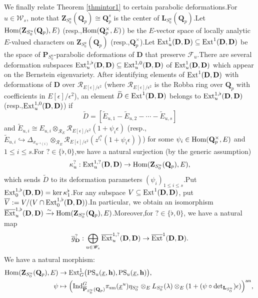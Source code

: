 \documentclass[10pt]{article}
\newcommand{\ind}{{\rm Ind}}
\newcommand{\homo}{{\rm Hom}}
\newcommand{\ext}{{\rm Ext}}
\newcommand{\ana}{{\rm an}}
\newcommand{\op}{{\overline{{\mathbf{P}}}}}
\newcommand{\sm}{{\rm sm}}
\newcommand{\Dpik}{{\mathbf{D}}}
\newcommand{\bL}{{\mathbf{L}}}
\newcommand{\bP}{{\mathbf{P}}}
\newcommand{\bQ}{{\mathbf{Q}}}
\newcommand{\bZ}{{\mathbf{Z}}}
\newcommand{\bh}{{\mathbf{h}}}
\newcommand{\cR}{\mathcal R}
\newcommand{\cF}{\mathcal F}
\newcommand{\sW}{\mathscr W}
\begin{document}
We finally  relate Theorem \ref{thmintor1} to certain parabolic deformations.\;For $u\in \sW_{s}$, note that $\bZ_{S_0^u}(\bQ_p)\cong \bQ_p^s$ is the center of $\bL_{S^u_0}(\bQ_p)$.\;Let $\homo(\bZ_{S_0^u}(\bQ_p),E)$ (resp.,\;$\homo(\bQ_p^{\times},E)$) be the $E$-vector space of locally analytic $E$-valued characters on $\bZ_{S_0^u}(\bQ_p)$ (resp.,\;$\bQ_p^{\times}$).\;Let $\ext^1_u(\Dpik,\Dpik)\subseteq \ext^1(\Dpik,\Dpik)$ be the space of $\bP_{S_0^u}$-parabolic deformations of $\Dpik$ that preserve $\cF_u$.\;There are several deformation subspaces $\ext^{1,\flat}_{u}(\Dpik,\Dpik)\subseteq \ext^{1,0}_{u}(\Dpik,\Dpik)$ of $\ext^{1}_{{u}}(\Dpik,\Dpik)$ which appear on the Bernstein eigenvariety. After identifying elements of $\ext^1(\Dpik,\Dpik)$ with deformations of $\Dpik$ over $\cR_{E[\epsilon]/\epsilon^2}$ (where $\cR_{E[\epsilon]/\epsilon^2}$ is the Robba ring over $\bQ_p$ with coefficients in $E[\epsilon]/\epsilon^2$), an element $\widetilde{D}\in \ext^1(\Dpik,\Dpik)$ belongs to $\ext^{1,\flat}_u(\Dpik,\Dpik)$ (resp.,\;$\ext^{1,0}_u(\Dpik,\Dpik)$) if
\[\widetilde{D}=[\widetilde{E}_{u,1}-\widetilde{E}_{u,2}-\cdots-\widetilde{E}_{u,s}]\]
and $\widetilde{E}_{u,i}\cong {E}_{u,i}\otimes_{\cR_{E}}\cR_{E[\epsilon]/\epsilon^2}(1+\psi_i\epsilon)$ (resp.,\;$\widetilde{E}_{u,i}\hookrightarrow  \Delta_{x_{u^{-1}(i)}}\otimes_{\cR_{E}}\cR_{E[\epsilon]/\epsilon^2}(z^{t^u_i}(1+\psi_i\epsilon))$) for some $\psi_i\in \homo(\bQ_p^{\times},E)$ and $1\leq i\leq s$.\;For $?\in\{\flat,0\}$,\;we have a  natural surjection (by the generic assumption)
\begin{equation}
	\kappa_{u}^{?}:\ext^{1,?}_{{u}}(\Dpik,\Dpik)\rightarrow \homo(\bZ_{S_0^u}(\bQ_p),E),
\end{equation}
which sends $\widetilde{D}$ to its deformation parameters $(\psi_i)_{1\leq i\leq s}$.\;Put $\ext^{1,\flat}_0(\Dpik,\Dpik)=\ker \kappa^{\flat}_1$.\;For any subspace $V\subseteq \ext^{1}(\Dpik,\Dpik)$, put $\overline{V}:=V/(V\cap \ext^{1,\flat}_0(\Dpik,\Dpik))$.\;In particular, we obtain an isomorphism
$\overline{\ext}^{1,\flat}_{u}(\Dpik,\Dpik)\xrightarrow{\sim }\homo(\bZ_{S_0^u}(\bQ_p),E)$.\;Moreover,\;for $?\in\{\flat,0\}$, we have a natural map
\begin{equation}\label{dfnforgDpikintro}
	\overline{g}^{?}_{\Dpik}:\bigoplus_{u\in\sW_{s}}\overline{\ext}^{1,?}_u(\Dpik,\Dpik)\rightarrow\overline{\ext}^{1}(\Dpik,\Dpik).
\end{equation}
We have a natural morphism:
\begin{equation}
	\begin{aligned}
		\homo(\bZ_{S^u_0}(\bQ_p),E)&\rightarrow\ext^1_{G}\big(\mathrm{PS}_{u}(\underline{x},\bh),\mathrm{PS}_{u}(\underline{x},\bh)\big),\;\\
		\psi&\mapsto \Big(\ind^G_{\op_{S_0^u}(\bQ_p)}\pi_{\sm}(\underline{x}^u)\eta_{S_0^u}\otimes_E L_{S_0^u}(\lambda)\otimes_E(1+(\psi\circ\mathrm{det}_{\bL_{S_0^u}})\epsilon)\Big)^{\ana},\;
	\end{aligned}
\end{equation}
\end{document}
